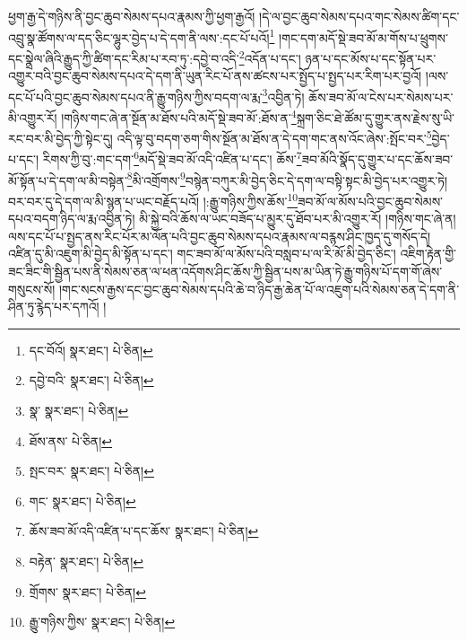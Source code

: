 ཕྱག་རྒྱ་དེ་གཉིས་ནི་བྱང་ཆུབ་སེམས་དཔའ་རྣམས་ཀྱི་ཕྱག་རྒྱའོ། །དེ་ལ་བྱང་ཆུབ་སེམས་དཔའ་གང་སེམས་ཚིག་དང་འབྲུ་སྣ་ཚོགས་ལ་དད་ཅིང་ལྷུར་བྱེད་པ་དེ་དག་ནི་ལས་:དང་པོ་པའོ།\footnote{དང་བོའོ།  སྣར་ཐང་།  པེ་ཅིན། } །གང་དག་མདོ་སྡེ་ཟབ་མོ་མ་གོས་པ་ཕྲུགས་དང་སྣྲེལ་ཞིའི་རྒྱུད་ཀྱི་ཚིག་དང་རིམ་པ་རབ་ཏུ་:དབྱེ་བ་འདི་\footnote{དབྱེ་བའི་  སྣར་ཐང་།  པེ་ཅིན། }འདོན་པ་དང་། ཉན་པ་དང་མོས་པ་དང་སྟོན་པར་འགྱུར་བའི་བྱང་ཆུབ་སེམས་དཔའ་དེ་དག་ནི་ཡུན་རིང་པོ་ནས་ཚངས་པར་སྤྱོད་པ་སྤྱད་པར་རིག་པར་བྱའོ། །ལས་དང་པོ་པའི་བྱང་ཆུབ་སེམས་དཔའ་ནི་རྒྱུ་གཉིས་ཀྱིས་བདག་ལ་རྨ་\footnote{སྣ་  སྣར་ཐང་།  པེ་ཅིན། }འབྱིན་ཏེ། ཆོས་ཟབ་མོ་ལ་ངེས་པར་སེམས་པར་མི་འགྱུར་རོ། །གཉིས་གང་ཞེ་ན་སྔོན་མ་ཐོས་པའི་མདོ་སྡེ་ཟབ་མོ་:ཐོས་ན་\footnote{ཐོས་ནས་  པེ་ཅིན། }སྐྲག་ཅིང་ཐེ་ཚོམ་དུ་གྱུར་ནས་རྗེས་སུ་ཡི་རང་བར་མི་བྱེད་ཀྱི་སྟེང་དུ། འདི་ལྟ་བུ་བདག་ཅག་གིས་སྔོན་མ་ཐོས་ན་དེ་དག་གང་ནས་འོང་ཞེས་:སྤོང་བར་\footnote{སྤང་བར་  སྣར་ཐང་།  པེ་ཅིན། }བྱེད་པ་དང་། རིགས་ཀྱི་བུ་:གང་དག་\footnote{གང་  སྣར་ཐང་།  པེ་ཅིན། }མདོ་སྡེ་ཟབ་མོ་འདི་འཛིན་པ་དང་། ཆོས་\footnote{ཆོས་ཟབ་མོ་འདི་འཛིན་པ་དང་ཆོས་  སྣར་ཐང་།  པེ་ཅིན། }ཟབ་མོའི་སྣོད་དུ་གྱུར་པ་དང་ཆོས་ཟབ་མོ་སྟོན་པ་དེ་དག་ལ་མི་བསྟེན་\footnote{བརྟེན་  སྣར་ཐང་།  པེ་ཅིན། }མི་འགྲོགས་\footnote{གྲོགས་  སྣར་ཐང་།  པེ་ཅིན། }བསྙེན་བཀུར་མི་བྱེད་ཅིང་དེ་དག་ལ་བསྟི་སྟང་མི་བྱེད་པར་འགྱུར་ཏེ། བར་བར་དུ་དེ་དག་ལ་མི་སྙན་པ་ཡང་བརྗོད་པའོ། །:རྒྱུ་གཉིས་ཀྱིས་ཆོས་\footnote{རྒྱུ་གཉིས་ཀྱིས་  སྣར་ཐང་།  པེ་ཅིན། }ཟབ་མོ་ལ་མོས་པའི་བྱང་ཆུབ་སེམས་དཔའ་བདག་ཉིད་ལ་རྨ་འབྱིན་ཏེ། མི་སྐྱེ་བའི་ཆོས་ལ་ཡང་བཟོད་པ་མྱུར་དུ་ཐོབ་པར་མི་འགྱུར་རོ། །གཉིས་གང་ཞེ་ན། ལས་དང་པོ་པ་སྤྱད་ནས་རིང་པོར་མ་ལོན་པའི་བྱང་ཆུབ་སེམས་དཔའ་རྣམས་ལ་བརྙས་ཤིང་ཁྱད་དུ་གསོད་དེ། འཛིན་དུ་མི་འཇུག་མི་བྱེད་མི་སྟོན་པ་དང་། གང་ཟབ་མོ་ལ་མོས་པའི་བསླབ་པ་ལ་རི་མོ་མི་བྱེད་ཅིང་། འཇིག་རྟེན་གྱི་ཟང་ཟིང་གི་སྦྱིན་པས་ནི་སེམས་ཅན་ལ་ཕན་འདོགས་ཤིང་ཆོས་ཀྱི་སྦྱིན་པས་མ་ཡིན་ཏེ་རྒྱུ་གཉིས་པོ་དག་གོ་ཞེས་གསུངས་སོ། །གང་སངས་རྒྱས་དང་བྱང་ཆུབ་སེམས་དཔའི་ཆེ་བ་ཉིད་རྒྱ་ཆེན་པོ་ལ་འཇུག་པའི་སེམས་ཅན་དེ་དག་ནི་ཤིན་ཏུ་རྙེད་པར་དཀའོ། །
